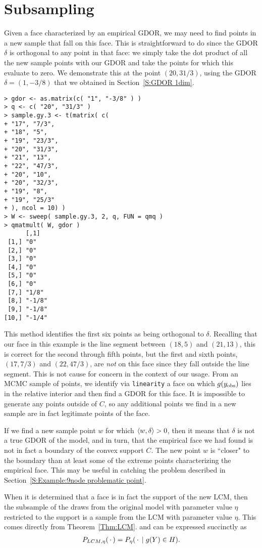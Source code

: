 \section{Subsampling} \label{S:Subsampling}
Given a face characterized by an empirical GDOR, we may need to
find points in a new sample that fall on this face.  This is straightforward to
do since the GDOR $\delta$ is orthogonal to any point in that face:
we simply take the dot product of all the new sample points with our GDOR
and take the points for which this evaluate to zero.
We demonstrate this at the point $(20, 31/3)$, using the GDOR $\delta = (1, -3/8)$
that we obtained in Section~\ref{S:GDOR 1dim}.
\begin{verbatim}
> gdor <- as.matrix(c( "1", "-3/8" ) )
> q <- c( "20", "31/3" )
> sample.gy.3 <- t(matrix( c(
+ "17", "7/3",
+ "18", "5",
+ "19", "23/3",
+ "20", "31/3",
+ "21", "13",
+ "22", "47/3",
+ "20", "10",
+ "20", "32/3",
+ "19", "8",
+ "19", "25/3"
+ ), ncol = 10) )
> W <- sweep( sample.gy.3, 2, q, FUN = qmq )
> qmatmult( W, gdor )
      [,1]  
 [1,] "0"   
 [2,] "0"   
 [3,] "0"   
 [4,] "0"   
 [5,] "0"   
 [6,] "0"   
 [7,] "1/8" 
 [8,] "-1/8"
 [9,] "-1/8"
[10,] "-1/4"
\end{verbatim}
This method identifies the first six points as being orthogonal to $\delta$.
Recalling that our face in this example is the line segment between $(18,5)$ and $(21,13)$,
this is correct for the second through fifth points, but
the first and sixth points, $(17, 7/3)$ and $(22,47/3)$, 
are \emph{not} on this face since they fall outside the line segment.  
This is not cause for concern in the context of our usage.  From an MCMC sample of points,
we identify via \texttt{linearity} a face on which $g(y_{\text{obs}})$ lies in the relative
interior and then find a GDOR for this face.  It is impossible to generate any
points outside of $C$, so any additional points we find in a new sample are in fact legitimate 
points of the face.  

If we find a new sample point $w$ for which $\langle w, \delta \rangle > 0$, then it means that 
$\delta$ is not a true GDOR of the model, and in turn, that the empirical face we had
found is not in fact a boundary of the convex support $C$.  The new point $w$ is ``closer"
to the boundary than at least some of the extreme points characterizing the empirical face.
This may be useful in catching the problem described in 
Section~\ref{S:Example:9node problematic point}.

When it is determined that a face is in fact the support of the new LCM,
then the subsample of the draws from the original model with parameter value $\eta$ 
restricted to the support is a sample from the LCM with 
parameter value $\eta$.  This comes directly from Theorem~\ref{Thm:LCM}.
 and can be expressed succinctly as
\begin{align*}
P_{LCM, \eta}(\,\cdot\,) = P_\eta( \,\cdot\, \mid g(Y) \in H ).
\end{align*}


